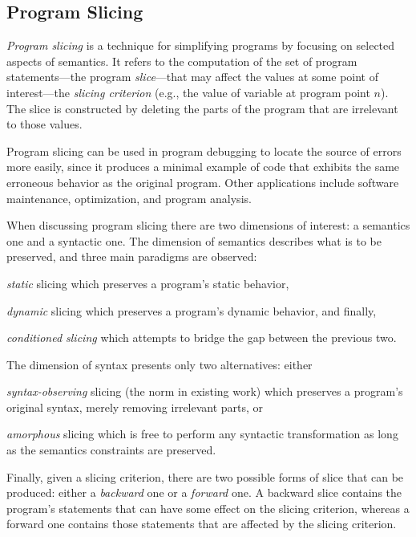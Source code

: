 \subsection{Program Slicing}

\emph{Program slicing} \cite{icse:1981:Weiser,article:1990:Horwitz,article:1995:Tip,scam:2001:Lucia} is a technique for simplifying programs by focusing on selected aspects of semantics. It refers to the computation of the set of program statements---the program \emph{slice}---that may affect the values at some point of interest---the \emph{slicing criterion} (e.g., the value of variable  at program point $n$). The slice is constructed by deleting the parts of the program that are irrelevant to those values. 

Program slicing can be used in program debugging to locate the source of errors more easily, since it produces a minimal example of code that exhibits the same erroneous behavior as the original program. Other applications include software maintenance, optimization, and program analysis.

When discussing program slicing there are two dimensions of interest: a semantics one and a syntactic one. The dimension of semantics describes what is to be preserved, and three main paradigms are observed:
\begin{inparaenum}[(1)]
\item \emph{static} slicing which preserves a program's static behavior,
\item \emph{dynamic} slicing which preserves a program's dynamic behavior, and finally,
\item \emph{conditioned slicing} which attempts to bridge the gap between the previous two.
\end{inparaenum}

The dimension of syntax presents only two alternatives: either 
\begin{inparaenum}[(1)]
\item \emph{syntax-observing} slicing (the norm in existing work) which preserves a program's original syntax, merely removing irrelevant parts, or
\item \emph{amorphous} slicing which is free to perform any syntactic transformation as long as the semantics constraints are preserved.
\end{inparaenum}

Finally, given a slicing criterion, there are two possible forms of slice that can be produced: either a \emph{backward} one or a \emph{forward} one. A backward slice contains the program's statements that can have some effect on the slicing criterion, whereas a forward one contains those statements that are affected by the slicing criterion.

